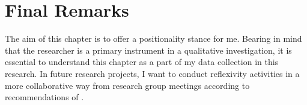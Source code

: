 \section{Final Remarks}
\label{reflexivity:final-remarks}

The aim of this chapter is to offer a positionality stance for me. Bearing in mind that the researcher is a primary instrument in a qualitative investigation, it is essential to understand this chapter as a part of my data collection in this research. In future research projects, I want to conduct reflexivity activities in a more collaborative way from research group meetings according to recommendations of .

                

        


        
